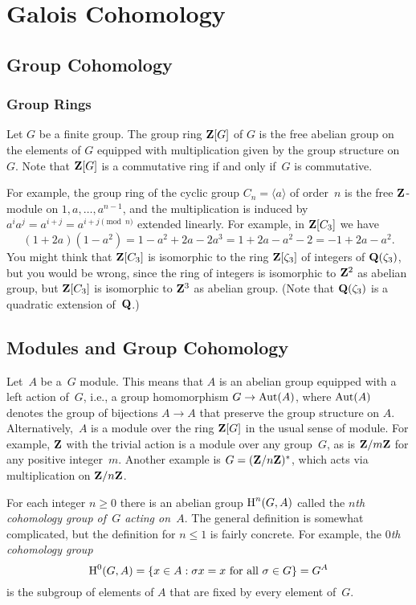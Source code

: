 \chapter{Galois Cohomology}\label{ch:gc}

\section{Group Cohomology}
\subsection{Group Rings}
Let $G$ be a finite group.  The group ring $\mathbf{Z}[G]$ of $G$ is the free
abelian group on the elements of $G$ equipped with 
multiplication given by the group structure on~$G$.  Note that $\mathbf{Z}[G]$
is a commutative ring if and only if~$G$ is commutative.  

For example, the
group ring of the cyclic group $C_n=\langle a\rangle$ of order~$n$ is
the free $\mathbf{Z}$-module on $1,a,\ldots, a^{n-1}$, and the multiplication
is induced by $a^i a^j = a^{i+j} = a^{i + j \pmod{n}}$ extended linearly.
For example, in  $\mathbf{Z}[C_3]$ we have
$$
  (1 + 2 a)(1 - a^2) = 1 - a^2 + 2a - 2 a^3 = 1 + 2a - a^2 - 2 = -1 + 2a - a^2.
$$
You might think that $\mathbf{Z}[C_3]$ is isomorphic to the ring $\mathbf{Z}[\zeta_3]$
of integers of $\mathbf{Q}(\zeta_3)$, but you would be wrong, since the ring
of integers is isomorphic to $\mathbf{Z}^2$ as abelian group, but $\mathbf{Z}[C_3]$
is isomorphic to $\mathbf{Z}^3$ as abelian group.  (Note that $\mathbf{Q}(\zeta_3)$
is a quadratic extension of~$\mathbf{Q}$.)

\section{Modules and Group Cohomology}
Let~$A$ be a~$G$ module.  This means that $A$ is an abelian group
equipped with a left action of~$G$, i.e., a group homomorphism $G\to
\operatorname{Aut}(A)$, where $\operatorname{Aut}(A)$ denotes the group of bijections $A\to A$
that preserve the group structure on $A$.  Alternatively,~$A$ is a
module over the ring $\mathbf{Z}[G]$ in the usual sense of module.  For
example, $\mathbf{Z}$ with the trivial action is a module over any group~$G$,
as is $\mathbf{Z}/m\mathbf{Z}$ for any positive integer~$m$.  Another example
is $G=(\mathbf{Z}/n\mathbf{Z})^*$, which acts via multiplication on $\mathbf{Z}/n\mathbf{Z}$.

For each integer $n\geq 0$ there is an abelian group $\operatorname{H}^n(G,A)$
called the {\em $n$th cohomology group of~$G$ acting on~$A$}.  The
general definition is somewhat complicated, but the definition for
$n\leq 1$ is fairly concrete.
For example, the {\em $0$th cohomology group}
$$
  \operatorname{H}^0(G,A) = \{x \in A : \sigma x = x \text{ for all } \sigma \in G\} = G^A
$$
is the subgroup of elements of $A$ that are fixed by every element
of~$G$.  

